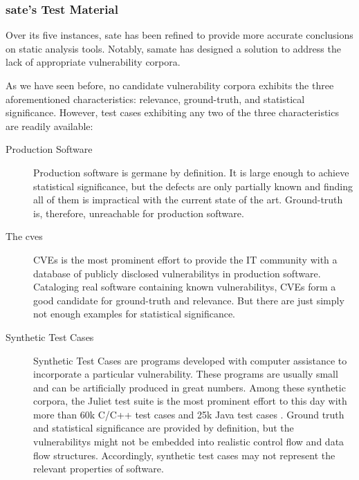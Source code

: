 \subsubsection{\gls{sate}'s Test Material}

\vspace{0.5cm}

Over its five instances, \gls{sate} has been refined to provide more accurate conclusions on static analysis tools. Notably, \gls{samate} has designed a solution to address the lack of appropriate \gls{vulnerability} corpora.

As we have seen before, no candidate \gls{vulnerability} corpora exhibits the three aforementioned characteristics: relevance, ground-truth, and statistical significance. However, test cases exhibiting any two of the three characteristics are readily available:

\clearpage

\begin{description}
    \item[Production Software] Production software is germane by definition. It is large enough to achie\-ve statistical significance, but the defects are only partially known and finding all of them is impractical with the current state of the art. Ground-truth is, therefore, unreachable for production software.
    \item[The \glspl{cve} \cite{mitre2016cve}] CVEs is the most prominent effort to  provide the IT community with a database of publicly disclosed \glspl{vulnerability} in production software. Cataloging real software containing known \glspl{vulnerability}, CVEs form a good candidate for ground-truth and relevance. But there are just simply not enough examples for statistical significance.
    \item[Synthetic Test Cases] Synthetic Test Cases are programs developed with computer assistance to incorporate a particular \gls{vulnerability}. These programs are usually small and can be artificially produced in great numbers. Among these synthetic corpora, the Juliet test suite is the most prominent effort to this day with more than 60k C/C++ test cases and 25k Java test cases \cite{nsa2016juliet}. Ground truth and statistical significance are provided by definition, but the \glspl{vulnerability} might not be embedded into realistic control flow and data flow structures. Accordingly, synthetic test cases may not represent the relevant properties of software.
\end{description}

